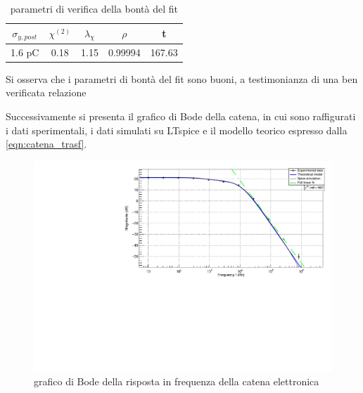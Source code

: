 \documentclass{article}
\begin{document}
\begin{table}[ht]
    \centering
    \begin{tabular}{ccccc}
        \toprule
        $\sigma_{y, post}$    &$\chi^{(2)}$    &$\lambda_{\chi}$   &$\rho$ &t   \\
        \midrule
        1.6 pC                &0.18            &1.15               &0.99994&167.63\\
        \bottomrule
    \end{tabular}
    \caption{parametri di verifica della bontà del fit}
\end{table}

Si osserva che i parametri di bontà del fit sono buoni, a testimonianza di una ben verificata relazione

Successivamente si presenta il grafico di Bode della catena, in cui sono raffigurati i dati sperimentali, i dati simulati
su LTspice e il modello teorico espresso dalla \ref{eqn:catena_trasf}.



\begin{center}
\begin{figure}[H]
\centering
\includegraphics[scale=0.4, angle=0]{bodecatena.pdf}
\caption{grafico di Bode della risposta in frequenza della catena elettronica}
\label{fig:catenaQvsV}
\end{figure}
\end{center}
\end{document}

